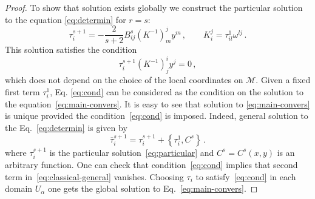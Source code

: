 \documentclass[a4paper,11pt,oneside]{amsart}
\theoremstyle{plain}
\numberwithin{equation}{section} %
\numberwithin{figure}{section} %
\newcommand{\pb}[2]{\left\{{}#1{},{}#2{}\right\}}
\def\bar{\overline}
\def\manM{{\mathcal M}}
\begin{document}
\begin{proof}
\noindent
To show that solution exists globally we construct the
particular solution to the equation \eqref{eq:determin} for
$r=s$:
\begin{equation}
\label{eq:particular}
  \tau^{s+1}_i=
-\frac{2}{s+2}
B^s_{ij} (K^{-1})^j_m  y^m\,, \qquad K_i^j=\tau^1_{il}\omega^{lj}\,.
\end{equation}
This solution satisfies the condition
\begin{equation}
\label{eq:cond}
  \tau^{s+1}_i (K^{-1})^i_j y^j=0\,,
\end{equation}
which does not depend on the choice of
the local coordinates on $\manM$.  Given a fixed first
term $\tau^1_i$, Eq. \eqref{eq:cond} can be considered
as the condition on the solution to the
equation~\eqref{eq:main-convers}.  It is easy to see that solution to
\eqref{eq:main-convers} is unique provided the condition~\eqref{eq:cond}
is imposed.  Indeed, general solution to the Eq.~\eqref{eq:determin} is
given by
\begin{equation}
\label{eq:classical-general}
{\bar\tau}_i^{s+1}=\tau_i^{s+1}+\pb{\tau^1_i}{C^s}\,.
\end{equation}
where $\tau_i^{s+1}$ is the particular solution~\eqref{eq:particular}
and $C^s=C^s(x,y)$ is an arbitrary function. One can check
that condition~\eqref{eq:cond} implies that second term
in~\eqref{eq:classical-general} vanishes.  Choosing $\tau_i$
to satisfy~\eqref{eq:cond} in each domain $U_\alpha$ one gets
the global solution to Eq.~\eqref{eq:main-convers}.
\end{proof}
\end{document}
